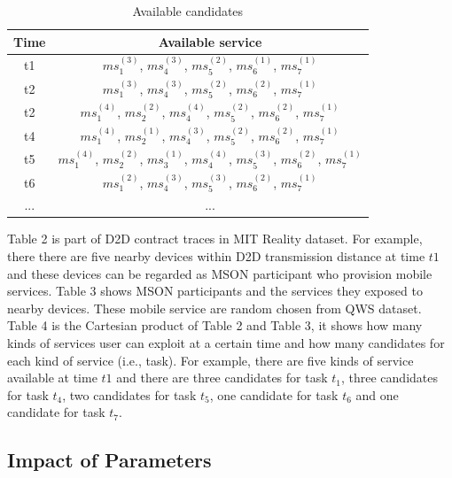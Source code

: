 \documentclass[10pt,journal,compsoc]{IEEEtran}
\begin{document}
\begin{table}[!t]
\renewcommand{\arraystretch}{1.8}
\caption{Available candidates}
\label{Available candidates}
\centering
\begin{tabular}{c c}
\hline
\bfseries Time & \bfseries Available service\\
\hline
t1     & $ms_1^{(3)}$, $ms_4^{(3)}$, $ms_5^{(2)}$, $ms_6^{(1)}$, $ms_7^{(1)}$ \\
t2     & $ms_1^{(3)}$, $ms_4^{(3)}$, $ms_5^{(2)}$, $ms_6^{(2)}$, $ms_7^{(1)}$ \\
t2     & $ms_1^{(4)}$, $ms_2^{(2)}$, $ms_4^{(4)}$, $ms_5^{(2)}$, $ms_6^{(2)}$, $ms_7^{(1)}$ \\
t4     & $ms_1^{(4)}$, $ms_2^{(1)}$, $ms_4^{(3)}$, $ms_5^{(2)}$, $ms_6^{(2)}$, $ms_7^{(1)}$ \\
t5     & $ms_1^{(4)}$, $ms_2^{(2)}$, $ms_3^{(1)}$, $ms_4^{(4)}$, $ms_5^{(3)}$, $ms_6^{(2)}$, $ms_7^{(1)}$ \\
t6     & $ms_1^{(2)}$, $ms_4^{(3)}$, $ms_5^{(3)}$, $ms_6^{(2)}$, $ms_7^{(1)}$ \\
... & ...\\
\hline
\end{tabular}
\end{table}

Table 2 is part of D2D contract traces in MIT Reality dataset. For example, there there are five nearby devices within D2D transmission distance at time $t1$ and these devices can be regarded as MSON participant who provision mobile services. Table 3 shows MSON participants and the services they exposed to nearby devices. These mobile service are random chosen from QWS dataset. Table 4 is the Cartesian product of Table 2 and Table 3, it shows how many kinds of services user can exploit at a certain time and how many candidates for each kind of service (i.e., task). For example, there are five kinds of service available at time $t1$ and there are three candidates for task $t_1$, three candidates for task $t_4$, two candidates for task $t_5$, one candidate for task $t_6$ and one candidate for task $t_7$.

\subsection{Impact of Parameters}
\end{document}

